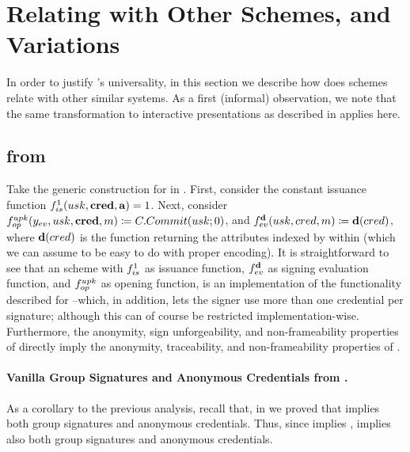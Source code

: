 \section{Relating \UAS with Other Schemes, and Variations}
\label{sec:transformations}

In order to justify \UAS's universality, in this section we describe how does
\UAS schemes relate with other similar systems. 
%
As a first (informal) observation, we note that the same transformation to
interactive presentations as described in \GSAC applies here.

\subsection{\GSAC from \UAS}
Take the generic construction for \UAS in .
First, consider the constant issuance function $f_{is}^1(usk,\mathbf{cred},\mathbf{a}) =
1$. Next, consider $f_{op}^{upk}(y_{ev},usk,\mathbf{cred},m) \coloneqq
C.Commit(usk;0)$, and $f_{ev}^{\mathbf{d}}(usk,cred,m) \coloneqq \mathbf{d}(cred)$,
where $\mathbf{d}(cred)$ is the function returning the attributes indexed by
\dattrs within \cred (which we can assume to be easy to do with proper
encoding). It is straightforward to see that an \UAS scheme with $f_{is}^1$
as issuance function, $f_{ev}^{\mathbf{d}}$ as signing evaluation function, and
$f_{op}^{upk}$ as opening function, is an implementation of the functionality
described for \GSAC --which, in addition, lets the signer use more than one
credential per signature; although this can of course be restricted
implementation-wise.
%
Furthermore, the anonymity, sign unforgeability, and non-frameability properties
of \UAS directly imply the anonymity, traceability, and non-frameability
properties of \GSAC.

\paragraph{Vanilla Group Signatures and Anonymous Credentials from \UAS.} As a
corollary to the previous analysis, recall that, in 
we proved that \GSAC implies both group signatures and anonymous credentials.
Thus, since \UAS implies \GSAC, \UAS implies also both group signatures and
anonymous credentials.

